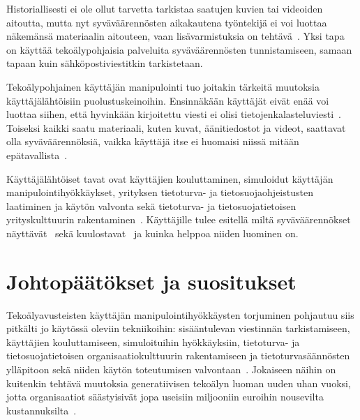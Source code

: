 \begin{otherlanguage}{finnish}
Historiallisesti ei ole ollut tarvetta tarkistaa saatujen kuvien tai videoiden aitoutta, mutta nyt syväväärennösten aikakautena työntekijä ei voi luottaa näkemänsä materiaalin aitouteen, vaan lisävarmistuksia on tehtävä~\citep{mirsky_Creation_Detection_Deepfakes_2021}. Yksi tapa on käyttää tekoälypohjaisia palveluita syväväärennösten tunnistamiseen, samaan tapaan kuin sähköpostiviestitkin tarkistetaan.


Tekoälypohjainen käyttäjän manipulointi tuo joitakin tärkeitä muutoksia käyttäjälähtöisiin puolustuskeinoihin. Ensinnäkään käyttäjät eivät enää voi luottaa siihen, että hyvinkään kirjoitettu viesti ei olisi tietojenkalasteluviesti~\citep{gupta_From_ChatGPT_to_ThreatGPT_2023}. Toiseksi kaikki saatu materiaali, kuten kuvat, äänitiedostot ja videot, saattavat olla syväväärennöksiä, vaikka käyttäjä itse ei huomaisi niissä mitään epätavallista~\citep{blauth_AI_Crime_Overview_Malicious_Use_Abuse_2022}.



Käyttäjälähtöiset tavat ovat käyttäjien kouluttaminen, simuloidut käyttäjän manipulointihyökkäykset, yrityksen tietoturva- ja tietosuojaohjeistusten laatiminen ja käytön valvonta sekä tietoturva- ja tietosuojatietoisen yrityskulttuurin rakentaminen~\citep{tsinganos_Towards_Automated_Recognition_Chat_SE_Enterprise_2018}. Käyttäjille tulee esitellä miltä syväväärennökset näyttävät~\citep{mirsky_Creation_Detection_Deepfakes_2021} sekä kuulostavat~\citep{doan_BTSE_Audio_Deepfake_Detection_2023} ja kuinka helppoa niiden luominen on.




\section*{Johtopäätökset ja suositukset}

Tekoälyavusteisten käyttäjän manipulointihyökkäysten torjuminen pohjautuu siis pitkälti jo käytössä oleviin tekniikoihin: sisääntulevan viestinnän tarkistamiseen, käyttäjien kouluttamiseen, simuloituihin hyökkäyksiin, tietoturva- ja tietosuojatietoisen organisaatiokulttuurin rakentamiseen ja tietoturvasäännösten ylläpitoon sekä niiden käytön toteutumisen valvontaan~\citep{fakhouri_AI_Driven_Solutions_SE_Attacks_2024}. Jokaiseen näihin on kuitenkin tehtävä muutoksia generatiivisen tekoälyn luoman uuden uhan vuoksi, jotta organisaatiot säästyisivät jopa useisiin miljooniin euroihin nousevilta kustannuksilta~\citep{eniza_Threat_Landscape_2024, verizon_Data_Breach_Investigations_Report_2024}.


\end{otherlanguage}
